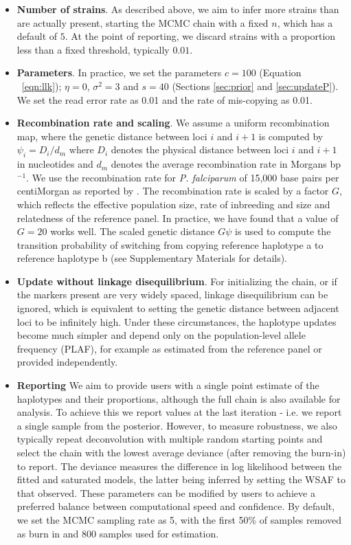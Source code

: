 \documentclass{nature}
\begin{document}
\begin{itemize}
\item {\bf Number of strains}. As described above, we aim to infer more strains than are actually present, starting the MCMC chain with a fixed $n$, which has a default of $5$. At the point of reporting, we discard strains with a proportion less than a fixed threshold, typically $0.01$.

\item {\bf Parameters}. In practice, we set the parameters $c=100$ (Equation ~\eqref{eqn:llk}); $\eta = 0$, $\sigma^2 = 3$ and $s=40$ (Sections \ref{sec:prior} and \ref{sec:updateP}).  We set the read error rate as 0.01 and the rate of mis-copying as 0.01.

\item {\bf Recombination rate and scaling}. We assume a uniform recombination map, where the genetic distance between loci $i$ and $i+1$ is computed by $\psi_i = D_i / d_m$ where $D_i$ denotes the physical distance between loci $i$ and $i+1$ in nucleotides and $d_m$ denotes the average recombination rate in Morgans bp$^{-1}$. We use the recombination rate for {\it P. falciparum} of 15,000 base pairs per centiMorgan as reported by \cite{Miles2016}. The recombination rate is scaled by a factor $G$, which reflects the effective population size, rate of inbreeding and size and relatedness of the reference panel.  In practice, we have found that a value of $G=20$ works well.  The scaled genetic distance $G\psi$ is used to compute the transition probability of switching from copying reference haplotype a to reference haplotype b (see Supplementary Materials for details).

\item {\bf Update without linkage disequilibrium}. For initializing the chain, or if the markers present are very widely spaced, linkage disequilibrium can be ignored, which is equivalent to setting the genetic distance between adjacent loci to be infinitely high.  Under these circumstances, the haplotype updates become much simpler and depend only on the population-level allele frequency (PLAF), for example as estimated from the reference panel or provided independently.

\item {\bf Reporting} We aim to provide users with a single point estimate of the haplotypes and their proportions, although the full chain is also available for analysis.  To achieve this we report values at the last iteration - i.e. we report a single sample from the posterior.  However, to measure robustness, we also typically repeat deconvolution with multiple random starting points and select the chain with the lowest average deviance (after removing the burn-in) to report. The deviance measures the difference in log likelihood between the fitted and saturated models, the latter being inferred by setting the WSAF to that observed.   These parameters can be modified by users to achieve a preferred balance between computational speed and confidence.  By default, we set the MCMC sampling rate as 5, with the first 50\% of samples removed as burn in and 800 samples used for estimation.


\end{itemize}
\end{document}
